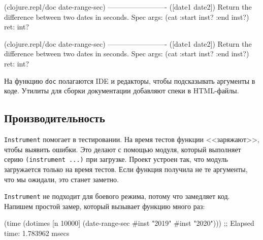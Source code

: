 \ifx\DEVICETYPE\MOBILE

\begin{english}
  \begin{clojure}
(clojure.repl/doc date-range-sec)
-------------------------
([date1 date2])
  Return the difference
            between two dates in seconds.
Spec
  args: (cat :start inst? :end inst?)
  ret: int?
  \end{clojure}
\end{english}

\else

\begin{english}
  \begin{clojure}
(clojure.repl/doc date-range-sec)
-------------------------
([date1 date2])
  Return the difference between two dates in seconds.
Spec
  args: (cat :start inst? :end inst?)
  ret: int?
  \end{clojure}
\end{english}

\fi

На функцию \verb|doc| полагаются IDE и редакторы, чтобы подсказывать аргументы в
коде. Утилиты для сборки документации добавляют спеки в HTML-файлы.

\subsection{Производительность}


\verb|Instrument| помогает в тестировании. На время тестов функции <<заряжают>>,
чтобы выявить ошибки. Это делают с помощью модуля, который выполняет серию
\verb|(instrument ...)| при загрузке. Проект устроен так, что модуль загружается
только на время тестов. Если функция получила не те аргументы, что мы ожидали,
это станет заметно.


\verb|Instrument| не подходит для боевого режима, потому что замедляет
код. Напишем простой замер, который вызывает функцию много раз:


\ifx\DEVICETYPE\MOBILE

\begin{english}
  \begin{clojure}
(time
 (dotimes [n 10000]
   (date-range-sec #inst "2019"
                   #inst "2020")))
;; Elapsed time: 1.783962 msecs
  \end{clojure}
\end{english}

